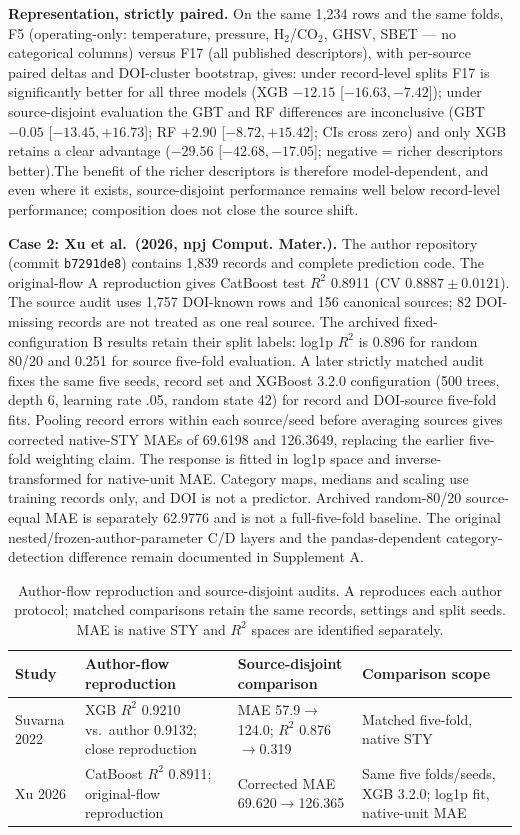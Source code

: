 \documentclass[11pt,a4paper]{article}
\begin{document}
\textbf{Representation, strictly paired.} On the same 1{,}234 rows and the same folds,
F5 (operating-only: temperature, pressure, H$_2$/CO$_2$, GHSV, SBET --- no categorical
columns) versus F17 (all published descriptors), with per-source paired deltas and
DOI-cluster bootstrap, gives: under record-level splits F17 is significantly better for
all three models (XGB $-12.15$ [$-16.63,-7.42$]); under source-disjoint evaluation the GBT and RF differences are inconclusive (GBT $-0.05$ [$-13.45,+16.73$]; RF $+2.90$ [$-8.72,+15.42$]; CIs cross zero) and only XGB retains a clear advantage ($-29.56$ [$-42.68,-17.05$]; negative = richer descriptors better).The benefit of the
richer descriptors is therefore model-dependent, and even where it exists,
source-disjoint performance remains well below record-level performance; composition
does not close the source shift.

\textbf{Case 2: Xu et al.\ (2026, npj Comput. Mater.).}
The author repository (commit \texttt{b7291de8}) contains 1,839 records and complete prediction code.
The original-flow A reproduction gives CatBoost test $R^2$ 0.8911 (CV $0.8887\pm0.0121$).
The source audit uses 1,757 DOI-known rows and 156 canonical sources; 82 DOI-missing records are not treated as one real source.
The archived fixed-configuration B results retain their split labels: log1p $R^2$ is 0.896 for random 80/20 and 0.251 for source five-fold evaluation.
A later strictly matched audit fixes the same five seeds, record set and XGBoost 3.2.0 configuration (500 trees, depth 6, learning rate .05, random state 42) for record and DOI-source five-fold fits.
Pooling record errors within each source/seed before averaging sources gives corrected native-STY MAEs of 69.6198 and 126.3649, replacing the earlier five-fold weighting claim.
The response is fitted in log1p space and inverse-transformed for native-unit MAE.
Category maps, medians and scaling use training records only, and DOI is not a predictor.
Archived random-80/20 source-equal MAE is separately 62.9776 and is not a full-five-fold baseline.
The original nested/frozen-author-parameter C/D layers and the pandas-dependent category-detection difference remain documented in Supplement A.

\begin{table}[t]\centering\small
\caption{Author-flow reproduction and source-disjoint audits. A reproduces each author protocol; matched comparisons retain the same records, settings and split seeds. MAE is native STY and $R^2$ spaces are identified separately.}\label{tab:audit}
\begin{tabularx}{\linewidth}{lXXX}\toprule
Study & Author-flow reproduction & Source-disjoint comparison & Comparison scope\\\midrule
Suvarna 2022 & XGB $R^2$ 0.9210 vs.\ author 0.9132; close reproduction & MAE 57.9$\to$124.0; $R^2$ 0.876$\to$0.319 & Matched five-fold, native STY\\
Xu 2026 & CatBoost $R^2$ 0.8911; original-flow reproduction & Corrected MAE 69.620$\to$126.365 & Same five folds/seeds, XGB 3.2.0; log1p fit, native-unit MAE\\
\bottomrule\end{tabularx}\end{table}
\end{document}
